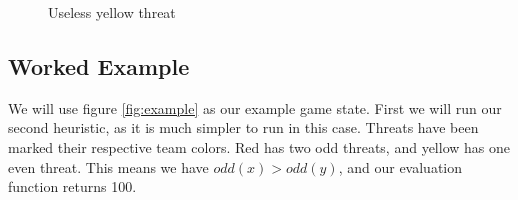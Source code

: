 \documentclass{article}
\newcommand{\rd}{\node [player, fill=red]{};}
\newcommand{\yw}{\node [player, fill=yellow] {};}
\newcommand{\gy}{\node [player, fill=white] {};}
\newcommand{\bt}{\node [threat, fill=orange!50] {};}
\begin{document}
\begin{figure}[t]
	\centering
	\caption{Useless yellow threat}
	\label{threatblock}
\end{figure}
\subsection{Worked Example}
We will use figure \ref{fig:example} as our example game state. First we will run our second heuristic, as it is much simpler to run in this case. Threats have been marked their respective team colors. Red has two odd threats, and yellow has one even threat. This means we have $odd(x) > odd(y)$, and our evaluation function returns 100.
	
\end{document}
